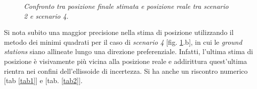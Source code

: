 \documentclass[a4paper,11pt,twoside]{book}
\begin{document}
	\begin{figure}[H]
		\centering
		\qquad
		\vspace{-0.3cm}
		\caption{\textit{Confronto tra posizione finale stimata e posizione reale tra \textsl{scenario 2} e \textsl{scenario 4}.}}
		\label{avvio2}
	\end{figure}

	\vspace{-0.2cm}
	
	 Si nota subito una maggior precisione nella stima di posizione utilizzando il metodo dei minimi quadrati per il caso di \textsl{scenario 4} [fig. \ref{avvio2}.b], in cui le \textit{ground stations} siano allineate lungo una direzione preferenziale. Infatti, l'ultima stima di posizione è visivamente più vicina alla posizione reale e addirittura quest'ultima rientra nei confini dell'ellissoide di incertezza. Si ha anche un riscontro numerico [tab \ref{tab1}] e [tab. \ref{tab2}].
	 
\end{document}
